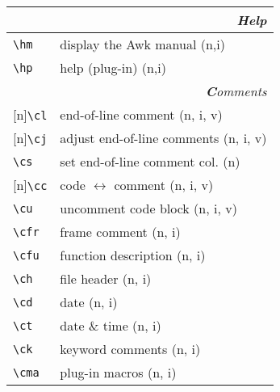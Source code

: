 \documentclass[oneside,10pt,landscape,DIV17]{scrartcl}
\newcommand{\Rep}{{\scriptsize{[n]}}}
\begin{document}
\begin{multicols}{3}
\begin{center}
\begin{tabular}[]{|p{11mm}|p{60mm}|}
\hline 
\multicolumn{2}{|r|}{\textsl{\textbf{H}elp}}\\[1.0ex]
\hline \verb'\hm'   & display the Awk manual                 \hfill (n,i)\\
\hline \verb'\hp'   & help (plug-in)                         \hfill (n,i)\\
\hline 
\hline
\multicolumn{2}{|r|}{\textsl{\textbf{C}omments}}                       \\[1.0ex]
\hline \Rep\verb'\cl'   & end-of-line comment               \hfill (n, i, v)\\
\hline \Rep\verb'\cj'   & adjust end-of-line comments       \hfill (n, i, v)\\
\hline     \verb'\cs'   & set end-of-line comment col.      \hfill (n)      \\
%
\hline \Rep\verb'\cc'   & code $\leftrightarrow$ comment    \hfill (n, i, v)\\
\hline     \verb'\cu'   & uncomment code block              \hfill (n, i, v)\\
%
\hline     \verb'\cfr'  & frame comment                     \hfill (n, i)   \\
\hline     \verb'\cfu'  & function description              \hfill (n, i)   \\
\hline     \verb'\ch'   & file header                       \hfill (n, i)   \\
\hline     \verb'\cd'   & date                              \hfill (n, i)   \\
\hline     \verb'\ct'   & date \& time                      \hfill (n, i)   \\
\hline     \verb'\ck'   & keyword comments                  \hfill (n, i)   \\
\hline     \verb'\cma'  & plug-in macros                    \hfill (n, i)   \\
\hline
\end{tabular}\\

\end{center}
\end{multicols}
\end{document}
